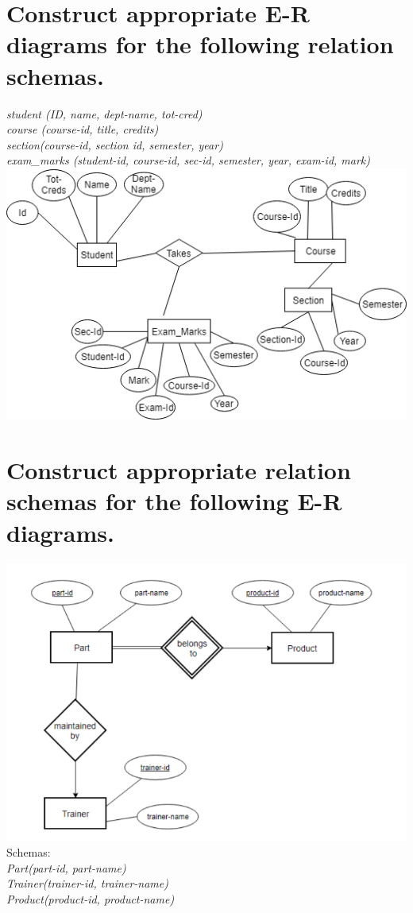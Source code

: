 \documentclass[12pt]{article}
\newcommand\tab[1][1cm]{\hspace{#1}}
\begin{document}
\section{Construct appropriate E-R diagrams for the following relation schemas. }
\textit{student (ID, name, dept-name, tot-cred)} \\
\tab \textit{course (course-id, title, credits)} \\
\tab \textit{section(course-id, section id, semester, year)} \\
\tab \textit{exam\_marks (student-id, course-id, sec-id, semester, year, exam-id, mark)}
\includegraphics[scale=0.75]{Homeworkssssss.png}
\section{Construct appropriate relation schemas for the following E-R diagrams.}
\includegraphics{RelationSchemaPhoto.png}\\
Schemas: \\
\textit{Part(part-id, part-name)}\\
\textit{Trainer(trainer-id, trainer-name)} \\
\textit{Product(product-id, product-name)}
\end{document}
